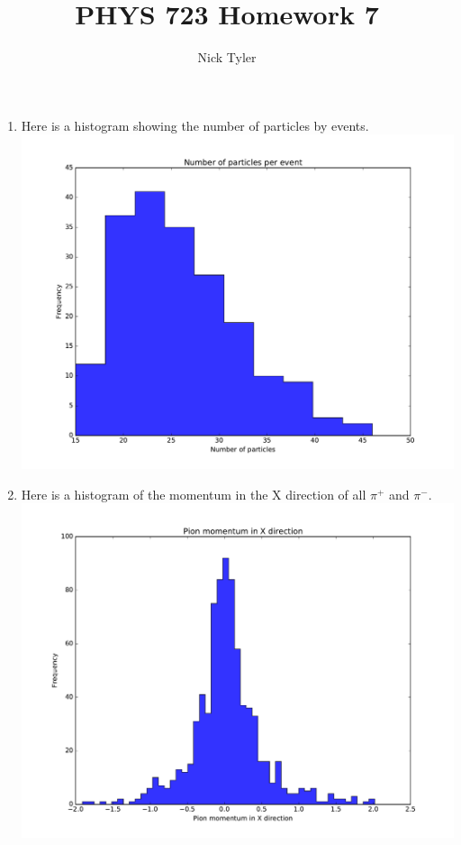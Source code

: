\documentclass[pdftex]{article}
\title{PHYS 723 Homework 7}
\author{Nick Tyler}
\date{}
\begin{document}
\captionsetup[figure]{aboveskip=-15pt}
\captionsetup[figure]{belowskip=15pt}
\maketitle
\begin{enumerate}
	\item  Here is a histogram showing the number of particles by events.\\
	\includegraphics[scale=0.4]{Number_of_particles.pdf}\\


	\item Here is a histogram of the momentum in the X direction of all $\pi^+$ and $\pi^-$. \\ 
	\includegraphics[scale=0.4]{Pion_px.pdf}\\




\end{enumerate}
\end{document}
